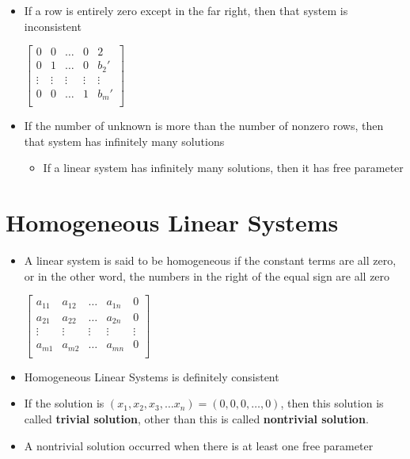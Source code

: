 \documentclass[a4paper,12pt]{article}
\begin{document}
\begin{itemize}
  \item If a row is entirely zero except in the far right, then that system is inconsistent
        \begin{center}
          \(\left[\begin{array}{cccc|c}
              0      & 0      & \dots  & 0      & 2      \\
              0      & 1      & \dots  & 0      & b_2'   \\
              \vdots & \vdots & \vdots & \vdots & \vdots \\
              0      & 0      & \dots  & 1      & b_m'   \\
            \end{array}\right] \)
        \end{center}
  \item If the number of unknown is more than the number of nonzero rows, then that system has infinitely many solutions
        \begin{itemize}
          \item If a linear system has infinitely many solutions, then it has free parameter
        \end{itemize}
\end{itemize}

\section*{Homogeneous Linear Systems}
\begin{itemize}
  \item A linear system is said to be homogeneous if the constant terms are all zero, or in the other word, the numbers in the right of the equal sign are all zero
        \begin{center}
          \(\left[\begin{array}{cccc|c}
              a_{11} & a_{12} & \dots  & a_{1n} & 0      \\
              a_{21} & a_{22} & \dots  & a_{2n} & 0      \\
              \vdots & \vdots & \vdots & \vdots & \vdots \\
              a_{m1} & a_{m2} & \dots  & a_{mn} & 0      \\
            \end{array}\right]\)
        \end{center}
  \item Homogeneous Linear Systems is definitely consistent
  \item If the solution is \((x_1, x_2, x_3,\dots x_n)=(0,0,0,\dots,0)\), then this solution is called \textbf{trivial solution}, other than this is called \textbf{nontrivial solution}.
  \item A nontrivial solution occurred when there is at least one free parameter
\end{itemize}
\end{document}
